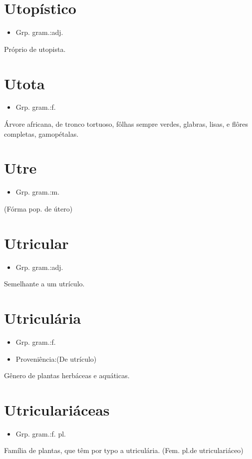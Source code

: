 \documentclass{article}
\begin{document}
\section{Utopístico}
\begin{itemize}
\item {Grp. gram.:adj.}
\end{itemize}
Próprio de utopista.
\section{Utota}
\begin{itemize}
\item {Grp. gram.:f.}
\end{itemize}
Árvore africana, de tronco tortuoso, fôlhas sempre verdes, glabras, lisas, e flôres completas, gamopétalas.
\section{Utre}
\begin{itemize}
\item {Grp. gram.:m.}
\end{itemize}
(Fórma pop. de \textunderscore útero\textunderscore )
\section{Utricular}
\begin{itemize}
\item {Grp. gram.:adj.}
\end{itemize}
Semelhante a um utrículo.
\section{Utriculária}
\begin{itemize}
\item {Grp. gram.:f.}
\end{itemize}
\begin{itemize}
\item {Proveniência:(De \textunderscore utrículo\textunderscore )}
\end{itemize}
Gênero de plantas herbáceas e aquáticas.
\section{Utriculariáceas}
\begin{itemize}
\item {Grp. gram.:f. pl.}
\end{itemize}
Família de plantas, que têm por typo a utriculária.
(Fem. \textunderscore pl.\textunderscore  de \textunderscore utriculariáceo\textunderscore )
\end{document}
